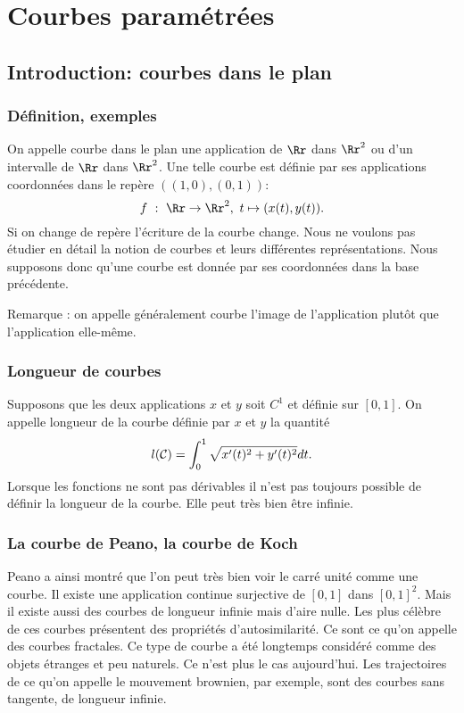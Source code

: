 \documentclass[class=report,crop=false]{standalone}
\begin{document}
\newpage
\section{Courbes paramétrées}

\subsection{Introduction: courbes dans le plan}
\subsubsection{Définition, exemples}
On appelle courbe dans le plan une application de $\Rr$ dans $\Rr^2$ ou d'un intervalle de $\Rr$ dans $\Rr^2$. Une telle courbe est définie par ses applications coordonnées dans le rep\`ere $((1,0), (0,1))$:
$$
f\ :\ \Rr\rightarrow \Rr^2,\ t\mapsto (x(t),y(t)).
$$
Si on change de rep\`ere l'écriture de la courbe change. Nous ne voulons pas étudier en détail la notion de courbes et leurs différentes représentations. Nous supposons donc qu'une courbe est donnée par ses coordonnées dans la base précédente. 

Remarque : on appelle généralement courbe l'image de l'application plut\^ot que l'application elle-m\^eme.
 
\subsubsection{Longueur de courbes}
Supposons que les deux applications $x$ et $y$ soit $C^1$ et définie sur $[0,1]$. On appelle longueur de la courbe définie par $x$ et $y$ la quantité
$$
l({\cal C})=\int_0^1\sqrt{x'(t)^2+y'(t)^2} dt.
$$
Lorsque les fonctions ne sont pas dérivables il n'est pas toujours possible de définir la longueur de la courbe. Elle peut tr\`es bien \^etre infinie. 
\subsubsection{La courbe de Peano, la courbe de Koch}
Peano a ainsi montré que l'on peut tr\`es bien voir le carré unité comme une courbe. Il existe une application continue surjective de $[0,1]$ dans $[0,1]^2$. 
Mais il existe aussi des courbes de longueur infinie mais d'aire nulle. Les plus cél\`ebre de ces courbes présentent des propriétés d'autosimilarité. Ce sont ce qu'on appelle des courbes fractales.
Ce type de courbe a été longtemps considéré comme des objets étranges et peu naturels. Ce n'est plus le cas aujourd'hui. Les trajectoires de ce qu'on appelle le mouvement brownien, par exemple, sont des courbes sans tangente, de longueur infinie. 
\end{document}
